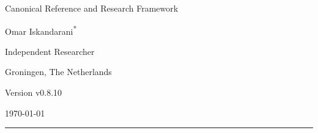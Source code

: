 \documentclass[11pt]{article}
\theoremstyle{definition}
\theoremstyle{plain}
\theoremstyle{remark}
\begin{document}
    
    \thispagestyle{empty}

    \begin{center}
        \vspace*{0.06\textheight}

        {\LARGE\bfseries \papertitle\par}
        \vspace{0.45cm}

        {\large Canonical Reference and Research Framework\par}
        \vspace{1.0cm}

        {\Large Omar Iskandarani\textsuperscript{*}\par}
        \vspace{0.35cm}

        {\normalsize Independent Researcher\par}
        {\normalsize Groningen, The Netherlands\par}
        \vspace{0.6cm}

        {\normalsize Version v0.8.10\par}
        {\normalsize \today\par}
        \vspace{0.9cm}

        \rule{0.82\textwidth}{0.5pt}
        \vspace{0.7cm}
    \end{center}

    \begin{abstract}
        \noindent
        This document presents Swirl-String Theory (SST) as a structured canonical synthesis rather than as a claim that every phenomenological sector has already been derived to theorem level. The text consolidates the primitive constant chain linking the effective fluid density, characteristic swirl speed, Compton anchoring, and horn/circulation scale; records delay-induced mode selection as the preferred non-operator route to spectral discreteness; and organizes the atomic bridge, spectroscopic filter, relational-time sector, and topology-based mass program within one explicitly stratified framework. Throughout, orthodox inputs, SST-internal derivations, bridge-level constructions, and conjectural extensions are kept distinct so that the canon remains internally coherent, externally comparable, and open to falsification.
    \end{abstract}
\end{document}
